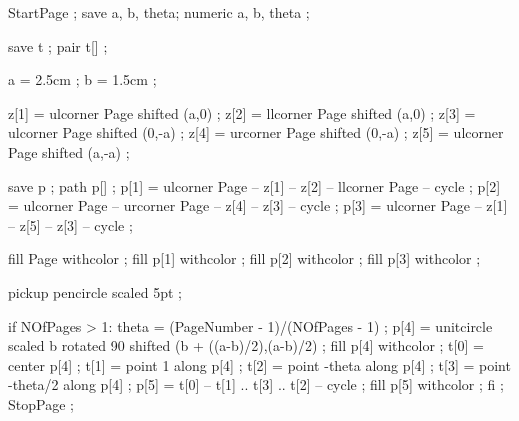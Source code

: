 StartPage ;
save a, b,  theta;
numeric a, b,  theta ;

save t ;
pair  t[] ;

a = 2.5cm ;
b = 1.5cm ;

z[1] = ulcorner Page shifted (a,0) ;
z[2] = llcorner Page shifted (a,0) ;
z[3] = ulcorner Page shifted (0,-a) ;
z[4] = urcorner Page shifted (0,-a) ;
z[5] = ulcorner Page shifted (a,-a) ;

save p ;
path p[] ;
p[1] = ulcorner Page -- z[1] -- z[2] -- llcorner Page -- cycle ;
p[2] = ulcorner Page -- urcorner Page -- z[4] -- z[3] -- cycle ;
p[3] = ulcorner Page -- z[1] -- z[5] -- z[3] -- cycle ;

fill Page withcolor  ;
fill p[1] withcolor  ;
fill p[2] withcolor  ;
fill p[3] withcolor  ;

pickup pencircle scaled 5pt ;

if NOfPages > 1:
	theta = (PageNumber - 1)/(NOfPages - 1) ;
	p[4] = unitcircle scaled b rotated 90 shifted (b + ((a-b)/2),(a-b)/2) ;
	fill p[4] withcolor  ;
	t[0] = center p[4] ;
	t[1] = point 1 along p[4] ;
	t[2] = point -theta along p[4] ;
	t[3] = point -theta/2 along p[4] ;
	p[5] = t[0] -- t[1] .. t[3] .. t[2] -- cycle ;
	fill p[5] withcolor  ;
fi ;
StopPage ;
\stopuseMPgraphic





\setupTitle[\c!headcolor={simpleslides:contrastcolor}]


\setupSlideTitle
   [\c!after=,
    \c!alternative=layer,
    \c!width=\textwidth,
    \c!height=2.5cm,
    \c!color=simpleslides:backgroundcolor]


\setupitemize[1][inmargin][color=simpleslides:backgroundcolor]

\protect
\stopmodule

\endinput

